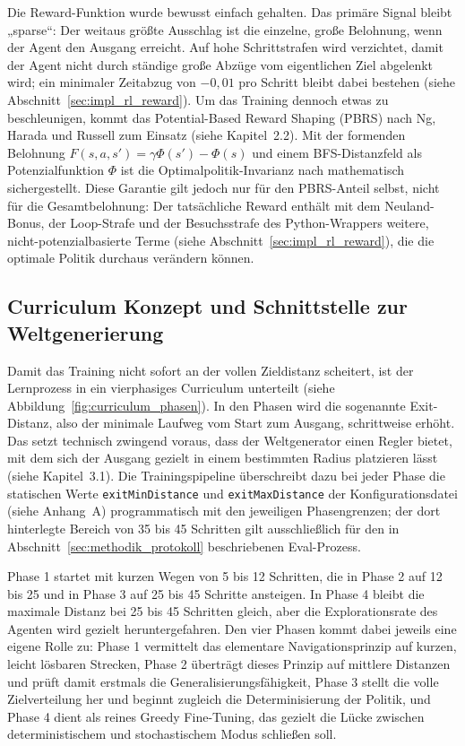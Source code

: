\documentclass[
  a4paper,
  11pt,
  twoside,
  BCOR=8mm,           %
  headings=big,
  numbers=noenddot,
  listof=totoc,       %
  captions=tableheading,
]{scrreprt}
\begin{document}
Die Reward-Funktion wurde bewusst einfach gehalten. Das primäre Signal bleibt „sparse“: Der weitaus größte Ausschlag ist die einzelne, große Belohnung, wenn der Agent den Ausgang erreicht. Auf hohe Schrittstrafen wird verzichtet, damit der Agent nicht durch ständige große Abzüge vom eigentlichen Ziel abgelenkt wird; ein minimaler Zeitabzug von $-0{,}01$ pro Schritt bleibt dabei bestehen (siehe Abschnitt~\ref{sec:impl_rl_reward}). Um das Training dennoch etwas zu beschleunigen, kommt das Potential-Based Reward Shaping (PBRS) nach Ng, Harada und Russell zum Einsatz (siehe Kapitel~2.2). Mit der formenden Belohnung $F(s,a,s') = \gamma\Phi(s') - \Phi(s)$ und einem BFS-Distanzfeld als Potenzialfunktion $\Phi$ ist die Optimalpolitik-Invarianz nach \citet{ng1999policy} mathematisch sichergestellt. Diese Garantie gilt jedoch nur für den PBRS-Anteil selbst, nicht für die Gesamtbelohnung: Der tatsächliche Reward enthält mit dem Neuland-Bonus, der Loop-Strafe und der Besuchsstrafe des Python-Wrappers weitere, nicht-potenzialbasierte Terme (siehe Abschnitt~\ref{sec:impl_rl_reward}), die die optimale Politik durchaus verändern können.

\subsection{Curriculum Konzept und Schnittstelle zur Weltgenerierung}
\label{sec:methodik_curriculum}

Damit das Training nicht sofort an der vollen Zieldistanz scheitert, ist der Lernprozess in ein vierphasiges Curriculum unterteilt (siehe Abbildung~\ref{fig:curriculum_phasen}). In den Phasen wird die sogenannte Exit-Distanz, also der minimale Laufweg vom Start zum Ausgang, schrittweise erhöht. Das setzt technisch zwingend voraus, dass der Weltgenerator einen Regler bietet, mit dem sich der Ausgang gezielt in einem bestimmten Radius platzieren lässt (siehe Kapitel~3.1). Die Trainingspipeline überschreibt dazu bei jeder Phase die statischen Werte \texttt{exitMinDistance} und \texttt{exitMaxDistance} der Konfigurationsdatei (siehe Anhang~A) programmatisch mit den jeweiligen Phasengrenzen; der dort hinterlegte Bereich von 35 bis 45 Schritten gilt ausschließlich für den in Abschnitt~\ref{sec:methodik_protokoll} beschriebenen Eval-Prozess.

Phase 1 startet mit kurzen Wegen von 5 bis 12 Schritten, die in Phase 2 auf 12 bis 25 und in Phase 3 auf 25 bis 45 Schritte ansteigen. In Phase 4 bleibt die maximale Distanz bei 25 bis 45 Schritten gleich, aber die Explorationsrate des Agenten wird gezielt heruntergefahren. Den vier Phasen kommt dabei jeweils eine eigene Rolle zu: Phase 1 vermittelt das elementare Navigationsprinzip auf kurzen, leicht lösbaren Strecken, Phase 2 überträgt dieses Prinzip auf mittlere Distanzen und prüft damit erstmals die Generalisierungsfähigkeit, Phase 3 stellt die volle Zielverteilung her und beginnt zugleich die Determinisierung der Politik, und Phase 4 dient als reines Greedy Fine-Tuning, das gezielt die Lücke zwischen deterministischem und stochastischem Modus schließen soll.
\end{document}
